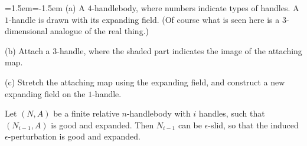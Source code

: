 \begin{center}
    \parbox{96mm}{\small\leftskip=1.5em\parindent=-1.5em
    (a) A $4$-handlebody, where numbers indicate types of handles.
    A $1$-handle is drawn with its expanding field.
    (Of course what is seen here is a $3$-dimensional analogue of the real thing.)
    
    (b) Attach a $3$-handle,
    where the shaded part indicates the image of the attaching map.
    
    (c) Stretch the attaching map using the expanding field,
    and construct a new expanding field on the $1$-handle.}\vspace{1pt}
\end{center}

\begin{lemma}\label{lem:expanded}
    Let $(N,A)$ be a finite relative $n$-handlebody with $i$ handles,
    such that $(N_{i-1},A)$ is good and expanded.
    Then $N_{i-1}$ can be $\epsilon$-slid,
    so that the induced $\epsilon$-perturbation is good and expanded.
\end{lemma}
    
